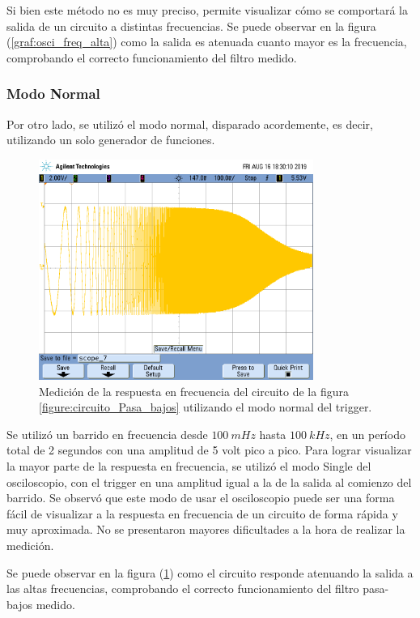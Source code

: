 \documentclass[11pt, a4paper]{article}
\begin{document}
Si bien este método no es muy preciso, permite visualizar cómo se comportará la salida de un circuito a distintas frecuencias. Se puede observar en la figura (\ref{graf:osci_freq_alta}) como la salida es atenuada cuanto mayor es la frecuencia, comprobando el correcto funcionamiento del filtro medido.

\subsubsection*{Modo Normal}
Por otro lado, se utilizó el modo normal, disparado acordemente, es decir, utilizando un solo generador de funciones.
\begin{figure}[H]
	\centering
	\includegraphics[width=0.8\textwidth,trim={0.6cm 7cm  1 5cm},clip]{ej3normal.png}
	\caption{Medición de la respuesta en frecuencia del circuito de la figura \ref{figure:circuito_Pasa_bajos} utilizando el modo normal del trigger.} 
	\label{graf:ej3modonormal}
\end{figure}
Se utilizó un barrido en frecuencia desde $100 \ mHz$ hasta $100 \ kHz$, en un período total de 2 segundos con una amplitud de 5 volt pico a pico. Para lograr visualizar la mayor parte de la respuesta en frecuencia, se utilizó el modo Single del osciloscopio, con el trigger en una amplitud igual a la de la salida al comienzo del barrido. Se observó que este modo de usar el osciloscopio puede ser una forma fácil de visualizar a la respuesta en frecuencia de un circuito de forma rápida y muy aproximada. No se presentaron mayores dificultades a la hora de realizar la medición.

Se puede observar en la figura (\ref{graf:ej3modonormal}) como el circuito responde atenuando la salida a las altas frecuencias, comprobando el correcto funcionamiento del filtro pasa-bajos medido.
\end{document}
